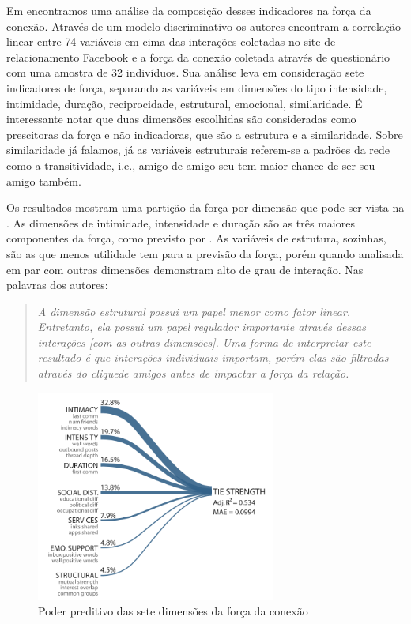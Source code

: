 Em \citet{Gilbert2009} encontramos uma análise da composição desses indicadores
na força da conexão. Através de um modelo discriminativo os autores encontram a
correlação linear entre 74 variáveis em cima das interações coletadas no site de
relacionamento Facebook e a força da conexão coletada através de questionário
com uma amostra de 32 indivíduos. Sua análise leva em consideração sete indicadores
de força, separando as variáveis em dimensões do tipo intensidade, intimidade,
duração, reciprocidade, estrutural, emocional, similaridade. É interessante
notar que duas dimensões escolhidas são consideradas como prescitoras da força e
não indicadoras, que são a estrutura e a similaridade. Sobre similaridade já
falamos, já as variáveis estruturais referem-se a padrões da rede como a
transitividade, i.e., amigo de amigo seu tem maior chance de ser seu amigo
também.

Os resultados mostram uma partição da força por dimensão que pode ser vista na
. As dimensões de intimidade, intensidade e duração são as três
maiores componentes da força, como previsto por \citeauthor{Granovetter1973}. As
variáveis de estrutura, sozinhas, são as que menos utilidade tem para a previsão
da força, porém quando analisada em par com outras dimensões demonstram alto de
grau de interação. Nas palavras dos autores:

	\begin{quote}{\citep{Gilbert2009}}
	\emph{A dimensão estrutural possui um papel menor como fator linear.
	Entretanto, ela possui um papel regulador importante através dessas interações
	[com as outras dimensões]. Uma forma de interpretar este resultado é que
	interações individuais importam, porém elas são filtradas através do
	clique\footnotemark de amigos antes de impactar a força da
	relação.}
	\end{quote}


\begin{figure}[h!]
  \centering
    \includegraphics[width=0.7\textwidth]{imgs/composicao-forca.png}
  	\caption{Poder preditivo das sete dimensões da força da conexão
  	\citep{Gilbert2009}}
    \label{fig:forca}
\end{figure}


